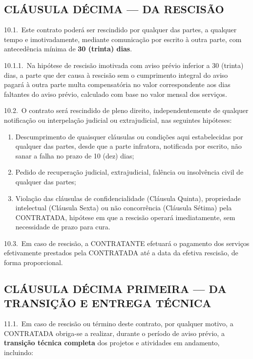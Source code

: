 \documentclass[11pt, a4paper]{article}
\begin{document}
\subsection{CLÁUSULA DÉCIMA — DA RESCISÃO}

10.1.\ Este contrato poderá ser rescindido por qualquer das partes, a qualquer tempo e imotivadamente, mediante comunicação por escrito à outra parte, com antecedência mínima de \textbf{30 (trinta) dias}.

10.1.1.\ Na hipótese de rescisão imotivada com aviso prévio inferior a 30 (trinta) dias, a parte que der causa à rescisão sem o cumprimento integral do aviso pagará à outra parte multa compensatória no valor correspondente aos dias faltantes do aviso prévio, calculado com base no valor mensal dos serviços.

10.2.\ O contrato será rescindido de pleno direito, independentemente de qualquer notificação ou interpelação judicial ou extrajudicial, nas seguintes hipóteses:

\begin{enumerate}[label=\alph*), leftmargin=1.8em]
    \item Descumprimento de quaisquer cláusulas ou condições aqui estabelecidas por qualquer das partes, desde que a parte infratora, notificada por escrito, não sanar a falha no prazo de 10 (dez) dias;
    \item Pedido de recuperação judicial, extrajudicial, falência ou insolvência civil de qualquer das partes;
    \item Violação das cláusulas de confidencialidade (Cláusula Quinta), propriedade intelectual (Cláusula Sexta) ou não concorrência (Cláusula Sétima) pela CONTRATADA, hipótese em que a rescisão operará imediatamente, sem necessidade de prazo para cura.
\end{enumerate}

10.3.\ Em caso de rescisão, a CONTRATANTE efetuará o pagamento dos serviços efetivamente prestados pela CONTRATADA até a data da efetiva rescisão, de forma proporcional.

\subsection{CLÁUSULA DÉCIMA PRIMEIRA — DA TRANSIÇÃO E ENTREGA TÉCNICA}

11.1.\ Em caso de rescisão ou término deste contrato, por qualquer motivo, a CONTRATADA obriga-se a realizar, durante o período de aviso prévio, a \textbf{transição técnica completa} dos projetos e atividades em andamento, incluindo:
\end{document}
